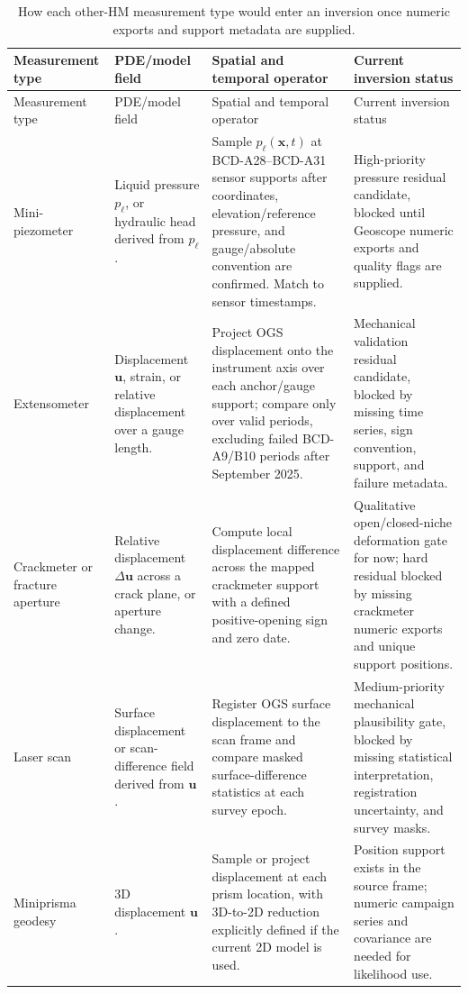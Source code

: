 \documentclass[10pt,a4paper]{article}
\newcommand{\uu}{\bm{u}}
\newcommand{\pp}{p_\ell}
\begin{document}
\begin{longtable}{@{}L{0.16\textwidth}L{0.19\textwidth}L{0.23\textwidth}Y@{}}
\caption{How each other-HM measurement type would enter an inversion once numeric
exports and support metadata are supplied.}\\
\toprule
Measurement type & PDE/model field & Spatial and temporal operator & Current inversion status \\
\midrule
\endfirsthead
\toprule
Measurement type & PDE/model field & Spatial and temporal operator & Current inversion status \\
\midrule
\endhead
\bottomrule
\endlastfoot
Mini-piezometer & Liquid pressure \(\pp\), or hydraulic head derived from \(\pp\). & Sample \(\pp(\bm x,t)\) at BCD-A28--BCD-A31 sensor supports after coordinates, elevation/reference pressure, and gauge/absolute convention are confirmed.  Match to sensor timestamps. & High-priority pressure residual candidate, blocked until Geoscope numeric exports and quality flags are supplied. \\
Extensometer & Displacement \(\uu\), strain, or relative displacement over a gauge length. & Project OGS displacement onto the instrument axis over each anchor/gauge support; compare only over valid periods, excluding failed BCD-A9/B10 periods after September 2025. & Mechanical validation residual candidate, blocked by missing time series, sign convention, support, and failure metadata. \\
Crackmeter or fracture aperture & Relative displacement \(\Delta\uu\) across a crack plane, or aperture change. & Compute local displacement difference across the mapped crackmeter support with a defined positive-opening sign and zero date. & Qualitative open/closed-niche deformation gate for now; hard residual blocked by missing crackmeter numeric exports and unique support positions. \\
Laser scan & Surface displacement or scan-difference field derived from \(\uu\). & Register OGS surface displacement to the scan frame and compare masked surface-difference statistics at each survey epoch. & Medium-priority mechanical plausibility gate, blocked by missing statistical interpretation, registration uncertainty, and survey masks. \\
Miniprisma geodesy & 3D displacement \(\uu\). & Sample or project displacement at each prism location, with 3D-to-2D reduction explicitly defined if the current 2D model is used. & Position support exists in the source frame; numeric campaign series and covariance are needed for likelihood use. \\

\end{longtable}
\end{document}
